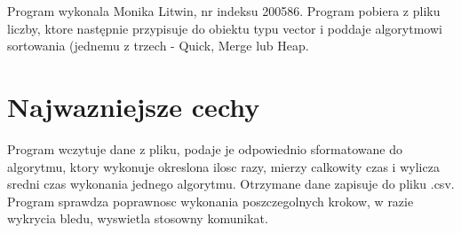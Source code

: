 \-Program wykonala \-Monika \-Litwin, nr indeksu 200586. \-Program pobiera z pliku liczby, ktore następnie przypisuje do obiektu typu vector i poddaje algorytmowi sortowania (jednemu z trzech -\/ \-Quick, \-Merge lub \-Heap.\section{\-Najwazniejsze cechy}\label{index_etykieta-Wazne-cechy}
\-Program wczytuje dane z pliku, podaje je odpowiednio sformatowane do algorytmu, ktory wykonuje okreslona ilosc razy, mierzy calkowity czas i wylicza sredni czas wykonania jednego algorytmu. \-Otrzymane dane zapisuje do pliku .csv. \-Program sprawdza poprawnosc wykonania poszczegolnych krokow, w razie wykrycia bledu, wyswietla stosowny komunikat. 